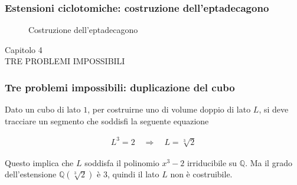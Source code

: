 \documentclass[11pt]{beamer}
\begin{document}
\begin{frame}
\frametitle{Estensioni ciclotomiche: costruzione dell'eptadecagono}

\begin{figure}[!h]
\begin{center}
\caption{Costruzione dell'eptadecagono}
\end{center}
\end{figure}

\end{frame}



\begin{frame}
\begin{center}
Capitolo 4 \\
TRE PROBLEMI IMPOSSIBILI
\end{center}
\end{frame}


\begin{frame}
\frametitle{Tre problemi impossibili: duplicazione del cubo}

Dato un cubo di lato $1$, per costruirne uno di volume doppio di lato $L$, si deve tracciare un segmento che soddisfi la seguente equazione

\begin{align*}
L^3 = 2 \quad \Rightarrow \quad L = \sqrt[3]{2}
\end{align*}

Questo implica che $L$ soddisfa il polinomio $x^3 - 2$ irriducibile su $\mathbb{Q}$. Ma il grado dell'estensione $\mathbb{Q}(\sqrt[3]{2})$ è $3$, quindi il lato $L$ non è costruibile.
\end{frame}
\end{document}
